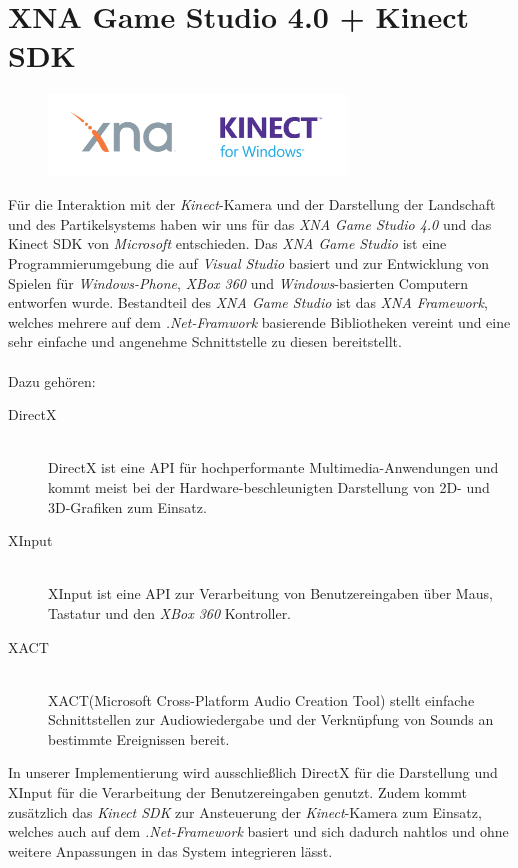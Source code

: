 \section{XNA Game Studio 4.0 + Kinect SDK}
\begin{Spacing}{\mylinespace}

\begin{figure}[h!]
	\centering
	\includegraphics[width=300px]{graphics/xna.png}
\end{figure}

Für die Interaktion mit der \textit{Kinect}-Kamera und der Darstellung der Landschaft und des Partikelsystems haben wir uns für das \textit{XNA Game Studio 4.0} und das Kinect SDK von \textit{Microsoft} entschieden. Das \textit{XNA Game Studio} ist eine Programmierumgebung die auf \textit{Visual Studio} basiert und zur Entwicklung von Spielen für \textit{Windows-Phone}, \textit{XBox 360} und \textit{Windows}-basierten Computern entworfen wurde. Bestandteil des \textit{XNA Game Studio} ist das \textit{XNA Framework}, welches mehrere auf dem \textit{.Net-Framwork} basierende Bibliotheken vereint und eine sehr einfache und angenehme Schnittstelle zu diesen bereitstellt.
\\\\
Dazu gehören:

\begin{description}
	\item[DirectX] \hfill \\
	DirectX ist eine API für hochperformante Multimedia-Anwendungen und kommt meist bei der Hardware-beschleunigten Darstellung von 2D- und 3D-Grafiken zum Einsatz. 
	\item[XInput] \hfill \\
	XInput ist eine API zur Verarbeitung von Benutzereingaben über Maus, Tastatur und den \textit{XBox 360} Kontroller.
	\item[XACT] \hfill \\
	XACT(Microsoft Cross-Platform Audio Creation Tool) stellt einfache Schnittstellen zur Audiowiedergabe und der Verknüpfung von Sounds an bestimmte Ereignissen bereit.
\end{description}

In unserer Implementierung wird ausschließlich DirectX für die Darstellung und XInput für die Verarbeitung der Benutzereingaben genutzt. Zudem kommt zusätzlich das \textit{Kinect SDK} zur Ansteuerung der \textit{Kinect}-Kamera zum Einsatz, welches auch auf dem \textit{.Net-Framework} basiert und sich dadurch nahtlos und ohne weitere Anpassungen in das System integrieren lässt.

\end{Spacing}
\newpage
\clearpage
